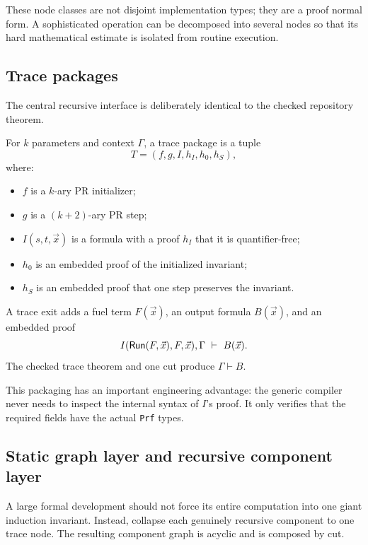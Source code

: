 These node classes are not disjoint implementation types; they are a proof
normal form.  A sophisticated operation can be decomposed into several nodes
so that its hard mathematical estimate is isolated from routine execution.

\subsection{Trace packages}

The central recursive interface is deliberately identical to the checked
repository theorem.

\begin{definition}
For \(k\) parameters and context \(\Gamma\), a trace package is a tuple
\[
  T=(f,g,I,h_I,h_0,h_S),
\]
where:
\begin{itemize}
\item \(f\) is a \(k\)-ary PR initializer;
\item \(g\) is a \((k+2)\)-ary PR step;
\item \(I(s,t,\vec x)\) is a formula with a proof \(h_I\) that it is
quantifier-free;
\item \(h_0\) is an embedded proof of the initialized invariant;
\item \(h_S\) is an embedded proof that one step preserves the invariant.
\end{itemize}
\end{definition}

A trace exit adds a fuel term \(F(\vec x)\), an output formula \(B(\vec x)\),
and an embedded proof
\[
  I(\mathsf{Run}(F,\vec x),F,\vec x),\Gamma\ \vdash\ B(\vec x).
\]
The checked trace theorem and one cut produce \(\Gamma\vdash B\).

This packaging has an important engineering advantage: the generic compiler
never needs to inspect the internal syntax of \(I\)'s proof.  It only verifies
that the required fields have the actual \texttt{Prf} types.

\subsection{Static graph layer and recursive component layer}

A large formal development should not force its entire computation into one
giant induction invariant.  Instead, collapse each genuinely recursive
component to one trace node.  The resulting component graph is acyclic and is
composed by cut.

